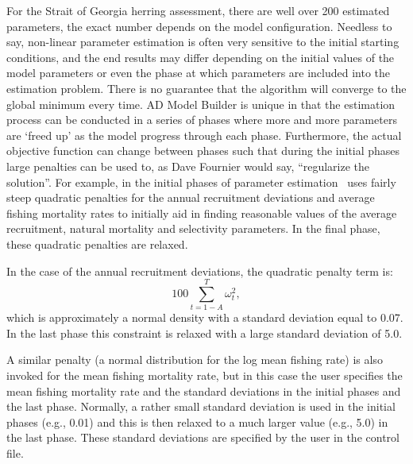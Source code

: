 For the Strait of Georgia herring assessment, there are well over 200 estimated parameters, the exact number depends on the model configuration.  Needless to say, non-linear parameter estimation is often very sensitive to the initial starting conditions, and the end results may differ depending on the initial values of the model parameters or even the phase at which parameters are included into the estimation problem.  There is no guarantee that the algorithm will converge to the global minimum every time.  AD Model Builder is unique in that the estimation process can be conducted in a series of phases where more and more parameters are `freed up' as the model progress through each phase.  Furthermore, the actual objective function can change between phases such that during the initial phases large penalties can be used to, as Dave Fournier would say, ``regularize the solution''.  For example, in the initial phases of parameter estimation \iscam\ uses fairly steep quadratic penalties for the annual recruitment deviations and average fishing mortality rates to initially aid in finding reasonable values of the average recruitment, natural mortality and selectivity parameters.  In the final phase, these quadratic penalties are relaxed.

In the case of the annual recruitment deviations, the quadratic penalty term is:\[ 100 \sum_{t=1-A}^T \omega_t^2,\] which is approximately a normal density with a standard deviation equal to 0.07.  In the last phase this constraint is relaxed with a large standard deviation of 5.0.

A similar penalty (a normal distribution for the log mean fishing rate) is also invoked for the mean fishing mortality rate, but in this case the user specifies the mean fishing mortality rate and the standard deviations in the initial phases and the last phase.  Normally, a rather small standard deviation is used in the initial phases (e.g., 0.01) and this is then relaxed to a much larger value (e.g., 5.0) in the last phase.  These standard deviations are specified by the user in the control file.

\clearpage
